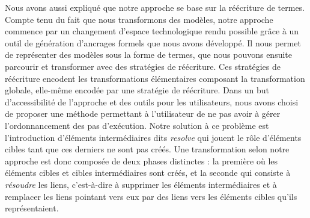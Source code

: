 Nous avons aussi expliqué que notre approche se base sur la réécriture de
termes. Compte tenu du fait que nous transformons des modèles, notre approche
commence par un changement d'espace technologique rendu possible grâce à un
outil de génération d'ancrages formels que nous avons développé. Il nous permet
de représenter des modèles {\ecore} sous la forme de termes, que nous pouvons
ensuite parcourir et transformer avec des stratégies de réécriture. Ces
stratégies de réécriture encodent les transformations élémentaires composant la
transformation globale, elle-même encodée par une stratégie de réécriture. Dans
un but d'accessibilité de l'approche et des outils pour les utilisateurs, nous
avons choisi de proposer une méthode permettant à l'utilisateur de ne pas avoir
à gérer l'ordonnancement des pas d'exécution. Notre solution à ce problème est
l'introduction d'éléments intermédiaires dits \emph{resolve} qui jouent le rôle
d'éléments cibles tant que ces derniers ne sont pas créés. Une transformation
selon notre approche est donc composée de deux phases distinctes : la première
où les éléments cibles et cibles intermédiaires sont créés, et la seconde qui
consiste à \emph{résoudre} les liens, c'est-à-dire à supprimer les éléments
intermédiaires et à remplacer les liens pointant vers eux par des liens vers
les éléments cibles qu'ils représentaient.


